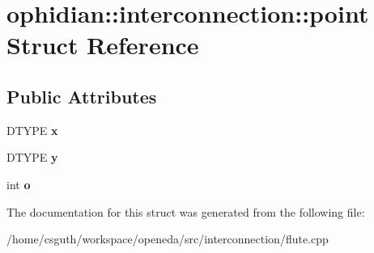 \hypertarget{structophidian_1_1interconnection_1_1point}{\section{ophidian\-:\-:interconnection\-:\-:point Struct Reference}
\label{structophidian_1_1interconnection_1_1point}
}
\subsection*{Public Attributes}
\begin{DoxyCompactItemize}
\item 
\hypertarget{structophidian_1_1interconnection_1_1point_a21d0b15f65a9e4b5f34665eff536d640}{D\-T\-Y\-P\-E {\bfseries x}}\label{structophidian_1_1interconnection_1_1point_a21d0b15f65a9e4b5f34665eff536d640}

\item 
\hypertarget{structophidian_1_1interconnection_1_1point_a57f34fc010b4b15747ee1d5c9ec39bfd}{D\-T\-Y\-P\-E {\bfseries y}}\label{structophidian_1_1interconnection_1_1point_a57f34fc010b4b15747ee1d5c9ec39bfd}

\item 
\hypertarget{structophidian_1_1interconnection_1_1point_aba3dc127fcb0812fdb1e99885f5857a9}{int {\bfseries o}}\label{structophidian_1_1interconnection_1_1point_aba3dc127fcb0812fdb1e99885f5857a9}

\end{DoxyCompactItemize}


The documentation for this struct was generated from the following file\-:\begin{DoxyCompactItemize}
\item 
/home/csguth/workspace/openeda/src/interconnection/flute.\-cpp\end{DoxyCompactItemize}
